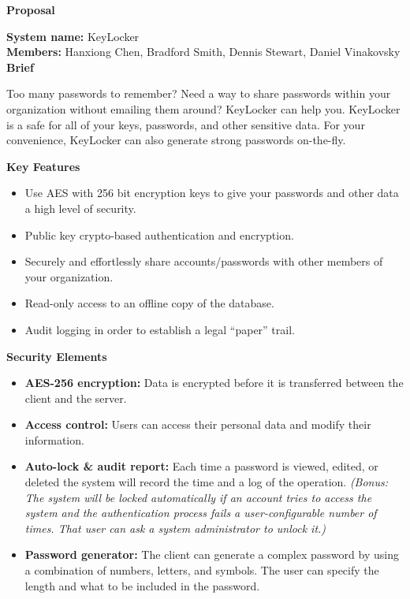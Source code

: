 \documentclass[11pt, letterpaper]{article}
\newcommand{\ProposalSection}[1]
{\noindent\textbf{#1}}
\begin{document}
\centerline{\textbf{Proposal}}
\smallskip
\noindent\textbf{System name: }KeyLocker\\
\noindent\textbf{Members: }Hanxiong Chen, Bradford Smith, Dennis Stewart, Daniel Vinakovsky\\

\ProposalSection{Brief}

\noindent
Too many passwords to remember? Need a way to share passwords within your organization without emailing them around? KeyLocker can help you. KeyLocker is a safe for all of your keys, passwords, and other sensitive data. For your convenience, KeyLocker can also generate strong passwords on-the-fly.
\smallskip

\ProposalSection{Key Features}
\begin{itemize} \itemsep1pt \parskip0pt 
    \item Use AES with 256 bit encryption keys to give your passwords and other data a high level of security.
    \item Public key crypto-based authentication and encryption.
    \item Securely and effortlessly share accounts/passwords with other members of your organization.
    \item Read-only access to an offline copy of the database.
    \item Audit logging in order to establish a legal “paper” trail.
\end{itemize}

\ProposalSection{Security Elements}
\begin{itemize} \itemsep1pt \parskip0pt 
    \item \textbf{AES-256 encryption: }Data is encrypted before it is transferred between the client and the server.
    \item \textbf{Access control: }Users can access their personal data and modify their information.
    \item \textbf{Auto-lock \& audit report: }Each time a password is viewed, edited, or deleted the system will record the time and a log of the operation. \textit{(Bonus: The system will be locked automatically if an account tries to access the system and the authentication process fails a user-configurable number of times. That user can ask a system administrator to unlock it.)}
    \item \textbf{Password generator: }The client can generate a complex password by using a combination of numbers, letters, and symbols. The user can specify the length and what to be included in the password.
\end{itemize}
\end{document}
